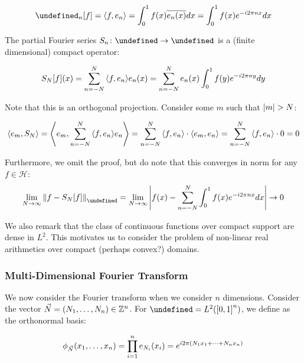 \documentclass[12pt]{article}
\let\H\undefined
\newcommand{\H}{\mathcal{H}}
\let\F\undefined
\newcommand{\F}{\mathcal{F}}
\begin{document}
\begin{align*}
  \F_n\brackets{f}
    = \inner{f, e_n}
    = \int_0^1 f\parens{x} \overline{e_n \parens{x}} dx
    = \int_0^1 f\parens{x} e^{-i 2 \pi n x} dx
\end{align*}

The partial Fourier series $\type{S_n}{\H}{\H}$ is a
(finite dimensional) compact operator:

\begin{align*}
  S_N {\left[f\right]} {\left(x\right)}
    = \sum_{n = -N}^{N} {\left\langle f, e_n\right\rangle} e_n {\left(x\right)}
    = \sum_{n = -N}^{N} e_n {\left(x\right)} \int_0^1 f(y) e^{- i 2 \pi n y} dy
\end{align*}

Note that this is an orthogonal projection.
Consider some $m$ such that
${\left\lvert m\right\rvert} > N$:

\begin{align*}
  {\left\langle e_m, S_N\right\rangle}
    = {\left\langle e_m, \sum_{n = -N}^{N} {\left\langle f, e_n\right\rangle} e_n\right\rangle}
    = \sum_{n = -N}^{N} {\left\langle f, e_n\right\rangle} \cdot {\left\langle e_m, e_n\right\rangle}
    = \sum_{n = -N}^{N} {\left\langle f, e_n\right\rangle} \cdot 0
    = 0
\end{align*}

Furthermore, we omit the proof, but do note that this converges in norm
for any $f \in \mathcal{H}$:
\begin{align*}
  \lim_{N \to \infty} \norm{f - S_N \brackets{f}}_{\H}
    = \lim_{N \to \infty}
      \abs{f\parens{x} -
            \sum_{n = -N}^{N} \int_0^1 f\parens{x} e^{-i 2\pi nx} dx}
    \to 0
\end{align*}

We also remark that the class of continuous functions over
compact support are dense in $L^2$.
This motivates us to consider the problem of non-linear real arithmetics
over compact (perhaps convex?) domains.


\subsubsection{Multi-Dimensional Fourier Transform}
We now consider the Fourier transform when we consider $n$ dimensions.
Consider the vector $\vec{N} = {\left(N_1, \ldots, N_n\right)} \in {\mathbb{Z}}^n$.
For $\H = L^2 \parens{\brackets{0, 1}^n}$,
we define as the orthonormal basis:

\begin{align*}
  \phi_{\vec{N}} {\left(x_1, \ldots, x_n\right)}
    = \prod_{i = 1}^{n} e_{N_i} {\left(x_i\right)}
    = e^{i 2 \pi {\left(N_1 x_1 + \cdots + N_n x_n\right)}}
\end{align*}
\end{document}
